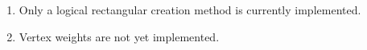 

\begin{enumerate}

\item Only a logical rectangular creation method is currently implemented.

\item Vertex weights are not yet implemented. 


\end{enumerate}


